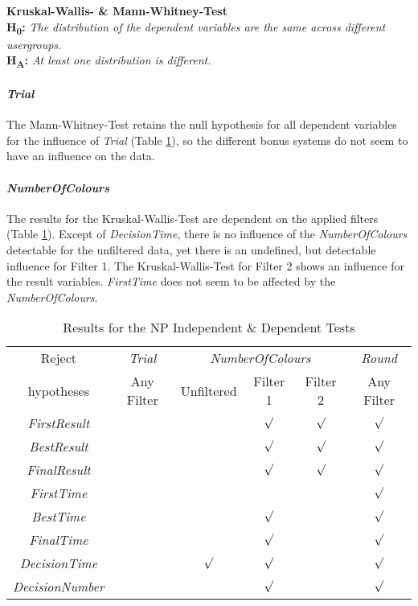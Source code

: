 \textbf{Kruskal-Wallis- \& Mann-Whitney-Test} \\
\textbf{H\textsubscript{0}:} \textit{The distribution of the dependent variables are the same across different usergroups.}\\
\textbf{H\textsubscript{A}:} \textit{At least one distribution is different.}

\paragraph{\textit{Trial}}
The Mann-Whitney-Test retains the null hypothesis for all dependent variables for the influence of \textit{Trial} (Table \ref{NPTest}), so the different bonus systems do not seem to have an influence on the data.
\newpage
\paragraph{\textit{NumberOfColours}}
The results for the Kruskal-Wallis-Test are dependent on the applied filters (Table \ref{NPTest}). Except of \textit{DecisionTime}, there is no influence of the \textit{NumberOfColours} detectable for the unfiltered data, yet there is an undefined, but detectable influence for Filter 1. The Kruskal-Wallis-Test for Filter 2 shows an influence for the result variables. \textit{FirstTime} does not seem to be affected by the \textit{NumberOfColours}. 
\begin{table}[htbp]
  \centering
  \caption{Results for the NP Independent \& Dependent Tests}
    \label{Results for the NP Test}
    \begin{tabular}{c|c|ccc|c}
    \toprule
       Reject   & \textit{Trial} & \multicolumn{3}{c|}{\textit{NumberOfColours}} & \textit{Round} \\
       hypotheses  & Any Filter & Unfiltered & Filter 1 & \multicolumn{1}{c|}{Filter 2} & Any Filter \\
    \midrule
	\textit{FirstResult} & &              & $\surd$     & $\surd$     &  $\surd$ \\
    \textit{BestResult} & &         	  & $\surd$     & $\surd$	   & $\surd$\\
    \textit{FinalResult} & &         	  & $\surd$ 	 & $\surd$	   & $\surd$ \\
    \textit{FirstTime} & &         		  &       		 &       	   & $\surd$ \\
    \textit{BestTime} & &         		  & $\surd$     &              & $\surd$ \\
    \textit{FinalTime} & &         		  & $\surd$     &              & $\surd$ \\
    \textit{DecisionTime} & &  $\surd$    & $\surd$     &       	   & $\surd$ \\
    \textit{DecisionNumber} & &           & $\surd$     &       	   & $\surd$ \\
    \bottomrule
    \end{tabular}%
  \label{NPTest}%
\end{table}%

